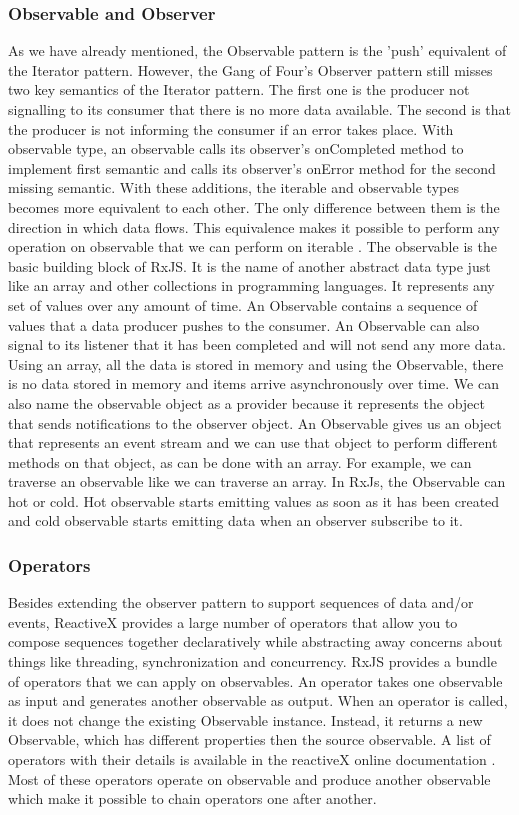 \subsubsection{Observable and Observer}
As we have already mentioned, the Observable pattern is the 'push' equivalent of the Iterator pattern. However, the Gang of Four's Observer pattern \cite{Gamma:1995:DPE:186897} still misses two key semantics of the Iterator pattern. The first one is the producer not signalling to its consumer that there is no more data available. The second is that the producer is not informing the consumer if an error takes place. With observable type, an observable calls its observer's onCompleted method to implement first semantic and calls its observer's onError method for the second missing semantic. With these additions, the iterable and observable types becomes more equivalent to each other. The only difference between them is the direction in which data flows. This equivalence makes it possible to perform any operation on observable that we can perform on iterable \cite{reactivex}.
The observable is the basic building block of RxJS. It is the name of another abstract data type just like an array and other collections in programming languages. It represents any set of values over any amount of time. An Observable contains a sequence of values that a data producer pushes to the consumer. An Observable can also signal to its listener that it has been completed and will not send any more data. Using an array, all the data is stored in memory and using the Observable, there is no data stored in memory and items arrive asynchronously over time. We can also name the observable object as a provider because it represents the object that sends notifications to the observer object.
An Observable gives us an object that represents an event stream and we can use that object to perform different methods on that object, as can be done with an array. For example, we can traverse an observable like we can traverse an array. In RxJs, the Observable can hot or cold. Hot observable starts emitting values as soon as it has been created and cold observable starts emitting data when an observer subscribe to it.

\subsubsection{Operators}
\label{subsec:Operators}
Besides extending the observer pattern to support sequences of data and/or events, ReactiveX provides a large number of operators that allow you to compose sequences together declaratively while abstracting away concerns about things like threading, synchronization and concurrency. RxJS provides a bundle of operators that we can apply on observables. An operator takes one observable as input and generates another observable as output. When an operator is called, it does not change the existing Observable instance. Instead, it returns a new Observable, which has different properties then the source observable. A list of operators with their details is available in the reactiveX online documentation \cite{reactivexOperators}. Most of these operators operate on observable and produce another observable which make it possible to chain operators one after another.

